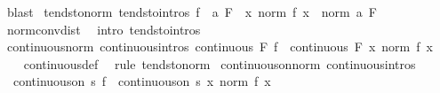 \begin{isabellebody}
\ blast%
\endisatagproof
{\isafoldproof}%
%
\isadelimproof
\isanewline
%
\endisadelimproof
\isanewline
{}\isamarkupfalse%
\ tendsto{\isacharunderscore}{\kern0pt}norm\ {\isacharbrackleft}{\kern0pt}tendsto{\isacharunderscore}{\kern0pt}intros{\isacharbrackright}{\kern0pt}{\isacharcolon}{\kern0pt}\ {\isachardoublequoteopen}{\isacharparenleft}{\kern0pt}f\ {\isasymlonglongrightarrow}\ a{\isacharparenright}{\kern0pt}\ F\ {\isasymLongrightarrow}\ {\isacharparenleft}{\kern0pt}{\isacharparenleft}{\kern0pt}{\isasymlambda}x{\isachardot}{\kern0pt}\ norm\ {\isacharparenleft}{\kern0pt}f\ x{\isacharparenright}{\kern0pt}{\isacharparenright}{\kern0pt}\ {\isasymlonglongrightarrow}\ norm\ a{\isacharparenright}{\kern0pt}\ F{\isachardoublequoteclose}\isanewline
%
\isadelimproof
\ \ %
\endisadelimproof
%
\isatagproof
{}\isamarkupfalse%
\ norm{\isacharunderscore}{\kern0pt}conv{\isacharunderscore}{\kern0pt}dist\ \isamarkupfalse%
\ {\isacharparenleft}{\kern0pt}intro\ tendsto{\isacharunderscore}{\kern0pt}intros{\isacharparenright}{\kern0pt}%
\endisatagproof
{\isafoldproof}%
%
\isadelimproof
\isanewline
%
\endisadelimproof
\isanewline
{}\isamarkupfalse%
\ continuous{\isacharunderscore}{\kern0pt}norm\ {\isacharbrackleft}{\kern0pt}continuous{\isacharunderscore}{\kern0pt}intros{\isacharbrackright}{\kern0pt}{\isacharcolon}{\kern0pt}\ {\isachardoublequoteopen}continuous\ F\ f\ {\isasymLongrightarrow}\ continuous\ F\ {\isacharparenleft}{\kern0pt}{\isasymlambda}x{\isachardot}{\kern0pt}\ norm\ {\isacharparenleft}{\kern0pt}f\ x{\isacharparenright}{\kern0pt}{\isacharparenright}{\kern0pt}{\isachardoublequoteclose}\isanewline
%
\isadelimproof
\ \ %
\endisadelimproof
%
\isatagproof
{}\isamarkupfalse%
\ continuous{\isacharunderscore}{\kern0pt}def\ \isamarkupfalse%
\ {\isacharparenleft}{\kern0pt}rule\ tendsto{\isacharunderscore}{\kern0pt}norm{\isacharparenright}{\kern0pt}%
\endisatagproof
{\isafoldproof}%
%
\isadelimproof
\isanewline
%
\endisadelimproof
\isanewline
{}\isamarkupfalse%
\ continuous{\isacharunderscore}{\kern0pt}on{\isacharunderscore}{\kern0pt}norm\ {\isacharbrackleft}{\kern0pt}continuous{\isacharunderscore}{\kern0pt}intros{\isacharbrackright}{\kern0pt}{\isacharcolon}{\kern0pt}\isanewline
\ \ {\isachardoublequoteopen}continuous{\isacharunderscore}{\kern0pt}on\ s\ f\ {\isasymLongrightarrow}\ continuous{\isacharunderscore}{\kern0pt}on\ s\ {\isacharparenleft}{\kern0pt}{\isasymlambda}x{\isachardot}{\kern0pt}\ norm\ {\isacharparenleft}{\kern0pt}f\ x{\isacharparenright}{\kern0pt}{\isacharparenright}{\kern0pt}{\isachardoublequoteclose}\isanewline

\end{isabellebody}
